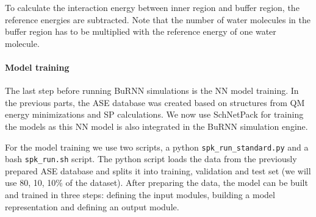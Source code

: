 To calculate the interaction energy between inner region and buffer region, the reference energies are subtracted. Note that the number of water molecules in the buffer region has to be multiplied with the reference energy of one water molecule.


\paragraph{Model training}
The last step before running BuRNN simulations is the NN model training. In the previous parts, the ASE database was created based on structures from QM energy minimizations and SP calculations. We now use SchNetPack for training the models as this NN model is also integrated in the BuRNN simulation engine.  

For the model training we use two scripts, a python \texttt{spk\_run\_standard.py} and a bash \texttt{spk\_run.sh} script. The python script loads the data from the previously prepared ASE database and splits it into training, validation and test set (we will use 80, 10, 10\% of the dataset). After preparing the data, the model can be built and trained in three steps: defining the input modules, building a model representation and defining an output module.

